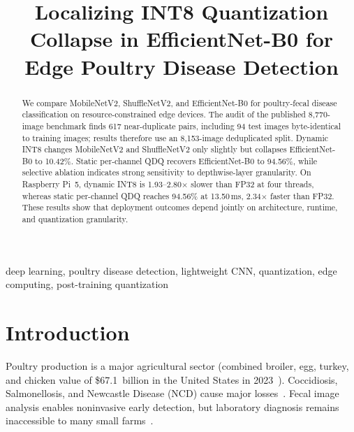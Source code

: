 \documentclass[conference,a4paper]{IEEEtran}
\begin{document}
\title{Localizing INT8 Quantization Collapse in EfficientNet-B0 for Edge Poultry Disease Detection}

\author{
}

\maketitle

\begin{abstract}
We compare MobileNetV2, ShuffleNetV2, and EfficientNet-B0 for poultry-fecal disease classification on resource-constrained edge devices. The audit of the published 8,770-image benchmark finds 617 near-duplicate pairs, including 94 test images byte-identical to training images; results therefore use an 8,153-image deduplicated split. Dynamic INT8 changes MobileNetV2 and ShuffleNetV2 only slightly but collapses EfficientNet-B0 to 10.42\%. Static per-channel QDQ recovers EfficientNet-B0 to 94.56\%, while selective ablation indicates strong sensitivity to depthwise-layer granularity. On Raspberry Pi~5, dynamic INT8 is 1.93--2.80$\times$ slower than FP32 at four threads, whereas static per-channel QDQ reaches 94.56\% at 13.50\,ms, 2.34$\times$ faster than FP32. These results show that deployment outcomes depend jointly on architecture, runtime, and quantization granularity.
\end{abstract}

\begin{IEEEkeywords}
deep learning, poultry disease detection, lightweight CNN, quantization, edge computing, post-training quantization
\end{IEEEkeywords}

\section{Introduction}

Poultry production is a major agricultural sector (combined broiler, egg, turkey, and chicken value of \$67.1~billion in the United States in 2023~\cite{usda2024}). Coccidiosis, Salmonellosis, and Newcastle Disease (NCD) cause major losses~\cite{machuve2022}. Fecal image analysis enables noninvasive early detection, but laboratory diagnosis remains inaccessible to many small farms~\cite{tasdelen2025}.
\end{document}
